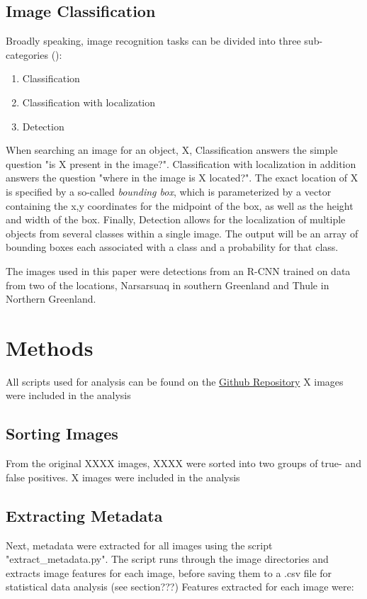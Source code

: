 \documentclass[12pt]{article}
\begin{document}
\subsection{Image Classification}
Broadly speaking, image recognition tasks can be divided into three sub-categories (\cite{C4W3L01ObjectLocalization}):
\begin{enumerate}
	\item Classification
	\item Classification with localization
	\item Detection
\end{enumerate}
When searching an image for an object, X, Classification answers the simple question "is X present in the image?". Classification with localization in addition answers the question "where in the image is X located?". The exact location of X is specified by a so-called \textit{bounding box}, which is parameterized by a vector containing the x,y coordinates for the midpoint of the box, as well as the height and width of the box. Finally, Detection allows for the localization of multiple objects from several classes within a single image. The output will be an array of bounding boxes each associated with a class and a probability for that class.

The images used in this paper were detections from an R-CNN trained on data from two of the locations, Narsarsuaq in southern Greenland and Thule in Northern Greenland.


\section{Methods}
All scripts used for analysis can be found on the \href{https://github.com/isalykke/Data-Science-Exam-2020}{Github Repository}
X images were included in the analysis
\subsection{Sorting Images}
From the original XXXX images, XXXX were sorted into two groups of true- and false positives.
X images were included in the analysis
\subsection{Extracting Metadata}

Next, metadata were extracted for all images using the script "extract_metadata.py". The script runs through the image directories and extracts image features for each image, before saving them to a .csv file for statistical data analysis (see section???) 
Features extracted for each image were:
\end{document}
